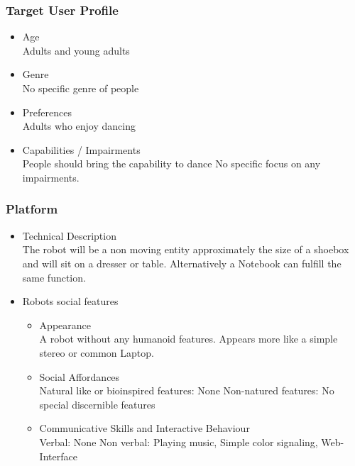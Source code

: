 \documentclass{article}
\begin{document}
\subsubsection{Target User Profile}
\begin{itemize}
\item Age\\
    Adults and young adults

\item Genre\\
    No specific genre of people

\item Preferences\\
    Adults who enjoy dancing

\item Capabilities / Impairments\\
    People should bring the capability to dance
    No specific focus on any impairments.
\end{itemize}

\subsubsection{Platform}
\begin{itemize}
\item Technical Description\\
    The robot will be a non moving entity approximately the size of a shoebox and will sit on a dresser or table. Alternatively a Notebook can fulfill the same function.

\item Robots social features
\begin{itemize}
    \item Appearance\\
        A robot without any humanoid features. Appears more like a simple stereo or common Laptop.

    \item Social Affordances\\
        Natural like or bioinspired features: None
        Non-natured features: No special discernible features

    \item Communicative Skills and Interactive Behaviour\\
        Verbal: None
        Non verbal: Playing music, Simple color signaling, Web-Interface
\end{itemize}
\end{itemize}
\end{document}
